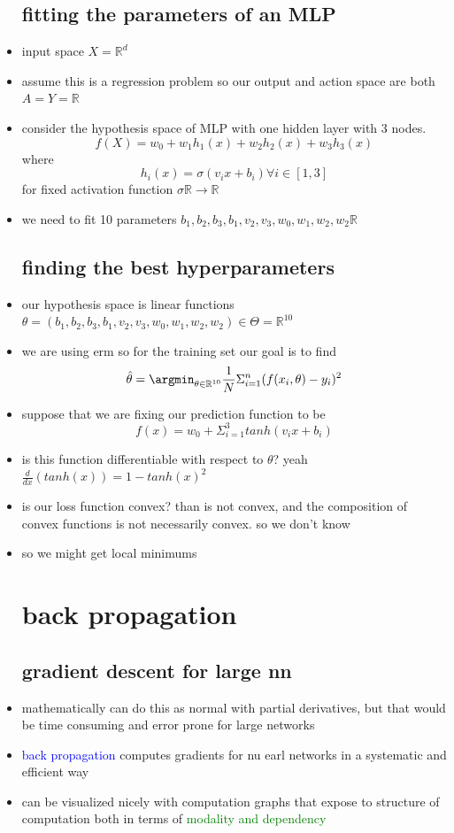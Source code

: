 \documentclass{article}
\begin{document}
\begin{itemize}
\subsection{fitting the parameters of an MLP}
\item input space $X=\mathbb{R}^{d}$
\item assume this is a regression problem so our output and action space are both $A=Y=\mathbb{R}$
\item consider the hypothesis space of MLP with one hidden layer with 3 nodes. $$f(X)=w_{0}+w_{1}h_{1}(x)+w_{2}h_{2}(x)+w_{3}h_{3}(x)$$
where $$h_{i}(x)=\sigma(v_ix+b_i)\forall i\in [1,3]$$ for fixed activation function $\sigma  \mathbb{R}\rightarrow \mathbb{R}$
\item we need to fit 10 parameters $b_1,b_2,b_3,b_1,v_2,v_3, w_0,w_1,w_2,w_2\mathbb{R}$

\subsection{finding the best hyperparameters}
\item our hypothesis space is linear functions $\theta = (b_1,b_2,b_3,b_1,v_2,v_3, w_0,w_1,w_2,w_2) \in \Theta=\mathbb{R}^{10}$
\item we are using erm so for the training set our goal is to find $$\hat{\theta}=\argmin_{\theta\in \mathbb{R}^{10}}\frac{1}{N}\Sigma_{i=1}^{n}(f(x_i,\theta)-y_i)^2$$
\item suppose that we are fixing our prediction function to be $$f(x)=w_0+\Sigma_{i=1}^{3}tanh(v_ix+b_i)$$
\item is this function differentiable with respect to $\theta$? yeah $\frac{d}{dx}(tanh(x))=1-tanh(x)^2$
\item is our loss function convex? than is not convex, and the composition of convex functions is not necessarily convex. so we don't know 
\item so we might get local minimums
\section{back propagation}
\subsection{gradient descent for large nn}
\item mathematically can do this as normal with partial derivatives, but that would be time consuming and error prone for large networks
\item \textcolor{blue}{back propagation} computes gradients for nu earl networks in a systematic and efficient way
\item can be visualized nicely with computation graphs that expose to structure of computation both in terms of \textcolor{green}{modality and dependency}

\end{itemize}
\end{document}
